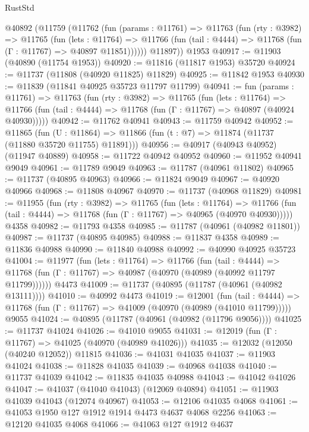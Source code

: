 \begin{lexlean}{RustStd}
\begin{coremodule}
    @40892
      (@11759
        (@11762
          (fun (params : @11761) =>
          @11763
            (fun (rty : @3982) =>
            @11765
              (fun (lets : @11764) =>
              @11766 (fun (tail : @4444) => @11768 (fun (Γ : @11767) => @40897 @11851))))))
        @11897))
    @1953
@40917 := @11903 (@40890 (@11754 @1953))
@40920 := @11816 (@11817 @1953) @35720
@40924 := @11737 (@11808 (@40920 @11825) @11829)
@40925 := @11842 @1953
@40930 := @11839 (@11841 @40925 @35723 @11797 @11799)
@40941 := fun (params : @11761) =>
  @11763
    (fun (rty : @3982) =>
    @11765
      (fun (lets : @11764) =>
      @11766 (fun (tail : @4444) => @11768 (fun (Γ : @11767) => @40897 (@40924 @40930)))))
@40942 := @11762 @40941
@40943 := @11759 @40942
@40952 := @11865
    (fun (U : @11864) => @11866 (fun (t : @7) => @11874 (@11737 (@11880 @35720 @11755) @11891)))
@40956 := @40917 (@40943 @40952) (@11947 @40889)
@40958 := @11722 @40942 @40952
@40960 := @11952 @40941 @9049
@40961 := @11789 @9049
@40963 := @11787 (@40961 @11802)
@40965 := @11737 (@40895 @40963)
@40966 := @11824 @9049
@40967 := @40920 @40966
@40968 := @11808 @40967
@40970 := @11737 (@40968 @11829)
@40981 := @11955
    (fun (rty : @3982) =>
    @11765
      (fun (lets : @11764) =>
      @11766 (fun (tail : @4444) => @11768 (fun (Γ : @11767) => @40965 (@40970 @40930)))))
    @4358
@40982 := @11793 @4358
@40985 := @11787 (@40961 (@40982 @11801))
@40987 := @11737 (@40895 @40985)
@40988 := @11837 @4358
@40989 := @11836 @40988
@40990 := @11840 @40988
@40992 := @40990 @40925 @35723
@41004 := @11977
    (fun (lets : @11764) =>
    @11766
      (fun (tail : @4444) =>
      @11768 (fun (Γ : @11767) => @40987 (@40970 (@40989 (@40992 @11797 @11799))))))
    @4473
@41009 := @11737 (@40895 (@11787 (@40961 (@40982 @13111))))
@41010 := @40992 @4473
@41019 := @12001
    (fun (tail : @4444) => @11768 (fun (Γ : @11767) => @41009 (@40970 (@40989 (@41010 @11799)))))
    @9055
@41024 := @40895 (@11787 (@40961 (@40982 (@11796 @9056))))
@41025 := @11737 @41024
@41026 := @41010 @9055
@41031 := @12019 (fun (Γ : @11767) => @41025 (@40970 (@40989 @41026)))
@41035 := @12032 (@12050 (@40240 @12052)) @11815
@41036 := @41031 @41035
@41037 := @11903 @41024
@41038 := @11828 @41035
@41039 := @40968 @41038
@41040 := @11737 @41039
@41042 := @11835 @41035 @40988
@41043 := @41042 @41026
@41047 := @41037 (@41040 @41043) (@12069 @40894)
@41051 := @11903 @41039 @41043 (@12074 @40967)
@41053 := @12106 @41035 @4068
@41061 := @41053 @1950 @127 @1912 @1914 @4473 @4637 @4068 @2256
@41063 := @12120 @41035 @4068
@41066 := @41063 @127 @1912 @4637

\end{coremodule}
\end{lexlean}
